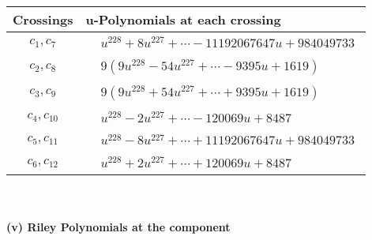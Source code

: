 \documentclass[1p]{elsarticle_modified}
\theoremstyle{definition}
\begin{document}
\begin{tabular}{m{50pt}|m{274pt}}
Crossings & \hspace{64pt}u-Polynomials at each crossing \\
\hline $$\begin{aligned}c_{1},c_{7}\end{aligned}$$&$\begin{aligned}
&u^{228}+8 u^{227}+\cdots-11192067647 u+984049733
\end{aligned}$\\
\hline $$\begin{aligned}c_{2},c_{8}\end{aligned}$$&$\begin{aligned}
&9(9 u^{228}-54 u^{227}+\cdots-9395 u+1619)
\end{aligned}$\\
\hline $$\begin{aligned}c_{3},c_{9}\end{aligned}$$&$\begin{aligned}
&9(9 u^{228}+54 u^{227}+\cdots+9395 u+1619)
\end{aligned}$\\
\hline $$\begin{aligned}c_{4},c_{10}\end{aligned}$$&$\begin{aligned}
&u^{228}-2 u^{227}+\cdots-120069 u+8487
\end{aligned}$\\
\hline $$\begin{aligned}c_{5},c_{11}\end{aligned}$$&$\begin{aligned}
&u^{228}-8 u^{227}+\cdots+11192067647 u+984049733
\end{aligned}$\\
\hline $$\begin{aligned}c_{6},c_{12}\end{aligned}$$&$\begin{aligned}
&u^{228}+2 u^{227}+\cdots+120069 u+8487
\end{aligned}$\\
\hline
\end{tabular}\\~\\
\newpage\renewcommand{\arraystretch}{1}
\flushleft \textbf{(v) Riley Polynomials at the component}\newline \\
\end{document}

